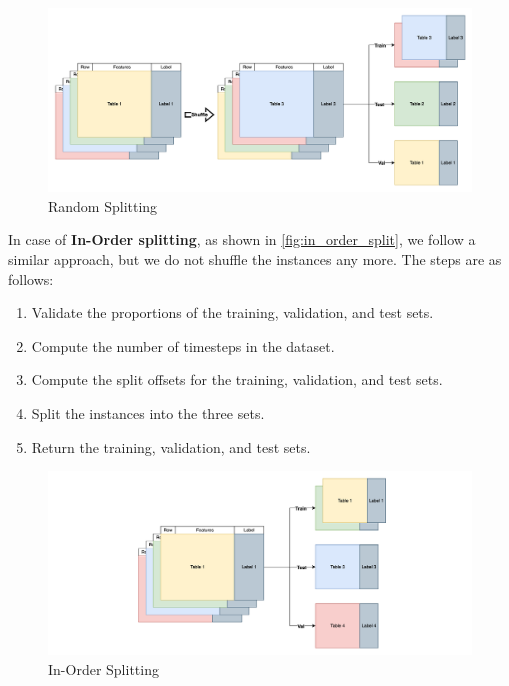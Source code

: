 \documentclass[review]{AIM_report}
\begin{document}
\begin{figure}
    \centering
    \includegraphics[width=1\textwidth]{files/splitting/random_split.png}
    \caption{Random Splitting}
    \label{fig:random_split}
\end{figure}

In case of \textbf{In-Order splitting}, as shown in \autoref{fig:in_order_split}, we follow a similar approach, but we do not shuffle the instances any more. The steps are as follows:
\begin{enumerate}
    \item Validate the proportions of the training, validation, and test sets.
    \item Compute the number of timesteps in the dataset.
    \item Compute the split offsets for the training, validation, and test sets.
    \item Split the instances into the three sets.
    \item Return the training, validation, and test sets.
\end{enumerate}

\newpage

\begin{figure}
    \centering
    \includegraphics[width=1\textwidth]{files/splitting/in_order_split.png}
    \caption{In-Order Splitting}
    \label{fig:in_order_split}
\end{figure}
\end{document}
